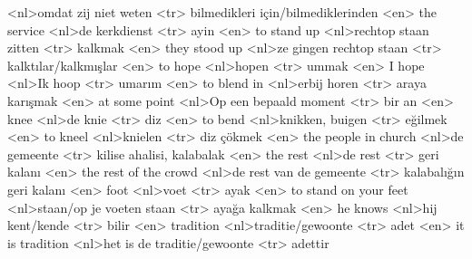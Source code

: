 <nl>omdat zij niet weten 
<tr> bilmedikleri için/bilmediklerinden 
<en> the service 
<nl>de kerkdienst 
<tr> ayin  
<en> to stand up 
<nl>rechtop staan zitten 
<tr> kalkmak 
<en> they stood up 
<nl>ze gingen rechtop staan 
<tr>  kalktılar/kalkmışlar 
<en> to hope 
<nl>hopen 
<tr> ummak 
<en> I hope 
<nl>Ik hoop 
<tr> umarım 
<en> to blend in  
<nl>erbij horen  
<tr> araya karışmak 
<en> at some point 
<nl>Op een bepaald moment 
<tr>  bir an 
<en> knee 
<nl>de knie 
<tr> diz
<en> to bend 
<nl>knikken, buigen 
<tr> eğilmek 
<en> to kneel 
<nl>knielen 
<tr> diz çökmek 
<en> the people in church 
<nl>de gemeente 
<tr>  kilise ahalisi, kalabalak 
<en> the rest 
<nl>de rest 
<tr> geri kalanı 
<en> the rest of the crowd 
<nl>de rest van de gemeente 
<tr>  kalabalığın geri kalanı
<en> foot 
<nl>voet 
<tr> ayak 
<en> to stand on your feet 
<nl>staan/op je voeten staan 
<tr> ayağa kalkmak 
<en> he knows 
<nl>hij  kent/kende 
<tr> bilir 
<en> tradition 
<nl>traditie/gewoonte
<tr> adet 
<en> it is tradition 
<nl>het is de traditie/gewoonte 
<tr> adettir 
